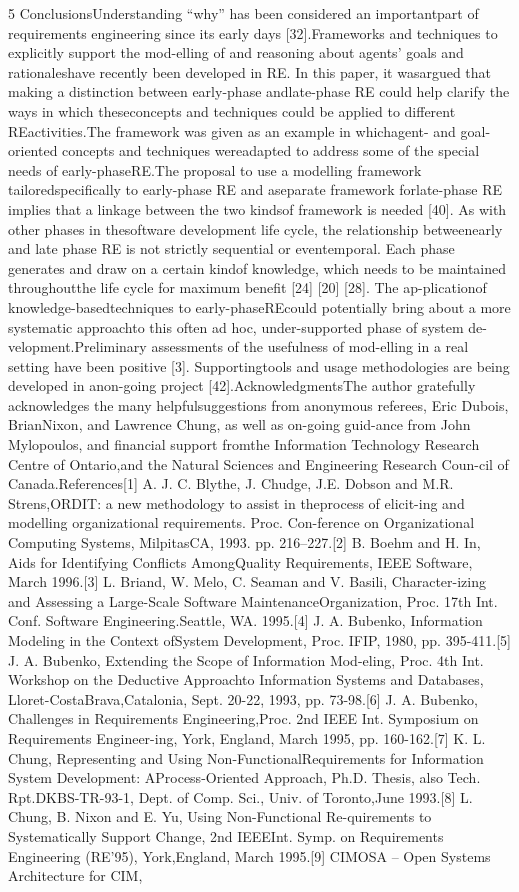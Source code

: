 5 ConclusionsUnderstanding “why” has been considered an importantpart of requirements engineering since its early days [32].Frameworks and techniques to explicitly support the mod-elling of and reasoning about agents’ goals and rationaleshave recently been developed in RE. In this paper, it wasargued that making a distinction between early-phase andlate-phase RE could help clarify the ways in which theseconcepts and techniques could be applied to different REactivities.The framework was given as an example in whichagent- and goal-oriented concepts and techniques wereadapted to address some of the special needs of early-phaseRE.The proposal to use a modelling framework tailoredspeciﬁcally to early-phase RE and aseparate framework forlate-phase RE implies that a linkage between the two kindsof framework is needed [40]. As with other phases in thesoftware development life cycle, the relationship betweenearly and late phase RE is not strictly sequential or eventemporal. Each phase generates and draw on a certain kindof knowledge, which needs to be maintained throughoutthe life cycle for maximum beneﬁt [24] [20] [28]. The ap-plicationof knowledge-basedtechniques to early-phaseREcould potentially bring about a more systematic approachto this often ad hoc, under-supported phase of system de-velopment.Preliminary assessments of the usefulness of mod-elling in a real setting have been positive [3]. Supportingtools and usage methodologies are being developed in anon-going project [42].AcknowledgmentsThe author gratefully acknowledges the many helpfulsuggestions from anonymous referees, Eric Dubois, BrianNixon, and Lawrence Chung, as well as on-going guid-ance from John Mylopoulos, and ﬁnancial support fromthe Information Technology Research Centre of Ontario,and the Natural Sciences and Engineering Research Coun-cil of Canada.References[1] A. J. C. Blythe, J. Chudge, J.E. Dobson and M.R. Strens,ORDIT: a new methodology to assist in theprocess of elicit-ing and modelling organizational requirements. Proc. Con-ference on Organizational Computing Systems, MilpitasCA, 1993. pp. 216–227.[2] B. Boehm and H. In, Aids for Identifying Conﬂicts AmongQuality Requirements, IEEE Software, March 1996.[3] L. Briand, W. Melo, C. Seaman and V. Basili, Character-izing and Assessing a Large-Scale Software MaintenanceOrganization, Proc. 17th Int. Conf. Software Engineering.Seattle, WA. 1995.[4] J. A. Bubenko, Information Modeling in the Context ofSystem Development, Proc. IFIP, 1980, pp. 395-411.[5] J. A. Bubenko, Extending the Scope of Information Mod-eling, Proc. 4th Int. Workshop on the Deductive Approachto Information Systems and Databases, Lloret-CostaBrava,Catalonia, Sept. 20-22, 1993, pp. 73-98.[6] J. A. Bubenko, Challenges in Requirements Engineering,Proc. 2nd IEEE Int. Symposium on Requirements Engineer-ing, York, England, March 1995, pp. 160-162.[7] K. L. Chung, Representing and Using Non-FunctionalRequirements for Information System Development: AProcess-Oriented Approach, Ph.D. Thesis, also Tech. Rpt.DKBS-TR-93-1, Dept. of Comp. Sci., Univ. of Toronto,June 1993.[8] L. Chung, B. Nixon and E. Yu, Using Non-Functional Re-quirements to Systematically Support Change, 2nd IEEEInt. Symp. on Requirements Engineering (RE’95), York,England, March 1995.[9] CIMOSA – Open Systems Architecture for CIM, 